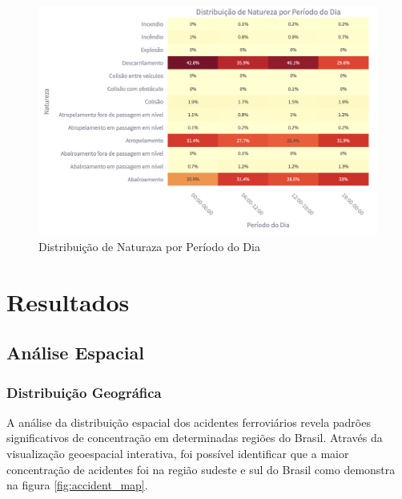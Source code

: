 \documentclass[conference]{IEEEtran}
\begin{document}
\begin{figure}[!htb]
    \centering
    \includegraphics[width=0.95\linewidth]{periodo_natureza.png}
    \caption{Distribuição de Naturaza por Período do Dia}
    \label{fig:periodo_natureza}
\end{figure}

\section{Resultados}

\subsection{Análise Espacial}

\subsubsection{Distribuição Geográfica}
A análise da distribuição espacial dos acidentes ferroviários revela padrões significativos de concentração em determinadas regiões do Brasil. Através da visualização geoespacial interativa, foi possível identificar que a maior concentração de acidentes foi na região sudeste e sul do Brasil como demonstra na figura \ref{fig:accident_map}.
\end{document}
